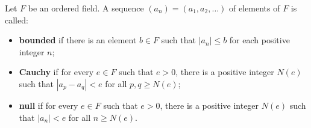 Let $F$ be an ordered field. A sequence $(a_n) = (a_1, a_2, \ldots)$ of elements of $F$ is called:
\begin{itemize}
\item \textbf{bounded} if there is an element $b \in F$ such that $|a_n| \leq b$ for each positive integer $n$;
\item \textbf{Cauchy} if for every $e \in F$ such that $e > 0$, there is a positive integer $N(e)$ such that $|a_p - a_q| < e$ for all $p, q \geq N(e)$;
\item \textbf{null} if for every $e \in F$ such that $e > 0$, there is a positive integer $N(e)$ such that $|a_n| < e$ for all $n \geq N(e)$.
\end{itemize}